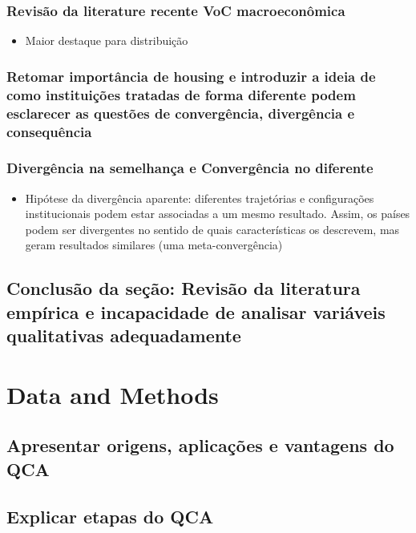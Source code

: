 \documentclass{SelfArx}
\begin{document}
\subsubsection*{Revisão da literature recente VoC macroeconômica}
\label{sec:org199392c}
\begin{itemize}
\item Maior destaque para distribuição
\end{itemize}
\subsubsection*{Retomar importância de housing e introduzir a ideia de como instituições tratadas de forma diferente podem esclarecer as questões de convergência, divergência e consequência}
\label{sec:orgeb73e8f}
\subsubsection*{Divergência na semelhança e Convergência no diferente}
\label{sec:org665b150}
\begin{itemize}
\item Hipótese da divergência aparente: diferentes trajetórias e configurações institucionais podem estar associadas a um mesmo resultado. Assim, os países podem ser divergentes no sentido de quais características os descrevem, mas geram resultados similares (uma meta-convergência)
\end{itemize}
\subsection*{Conclusão da seção: Revisão da literatura empírica e incapacidade de analisar variáveis qualitativas adequadamente}
\label{sec:org9af346c}
\section*{Data and Methods}
\label{sec:org0c99d55}
\subsection*{Apresentar origens, aplicações e vantagens do QCA}
\label{sec:org5179d81}
\subsection*{Explicar etapas do QCA}
\label{sec:org0b05d98}
\end{document}
